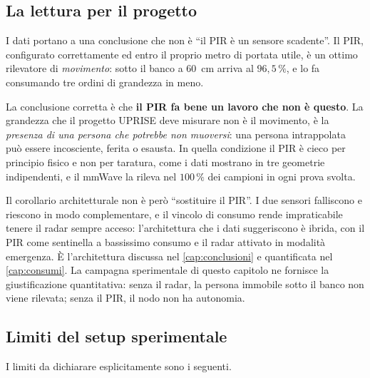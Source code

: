 \subsection{La lettura per il progetto}

I dati portano a una conclusione che non è ``il PIR è un sensore scadente''. Il PIR,
configurato correttamente ed entro il proprio metro di portata utile, è un ottimo
rilevatore di \emph{movimento}: sotto il banco a 60~cm arriva al $96{,}5\,\%$, e lo fa
consumando tre ordini di grandezza in meno.

La conclusione corretta è che \textbf{il PIR fa bene un lavoro che non è questo}. La
grandezza che il progetto UPRISE deve misurare non è il movimento, è la
\emph{presenza di una persona che potrebbe non muoversi}: una persona intrappolata può
essere incosciente, ferita o esausta. In quella condizione il PIR è cieco per
principio fisico e non per taratura, come i dati mostrano in tre geometrie
indipendenti, e il mmWave la rileva nel $100\,\%$ dei campioni in ogni prova svolta.

Il corollario architetturale non è però ``sostituire il PIR''. I due sensori
falliscono e riescono in modo complementare, e il vincolo di consumo rende
impraticabile tenere il radar sempre acceso: l'architettura che i dati suggeriscono è
ibrida, con il PIR come sentinella a bassissimo consumo e il radar attivato in
modalità emergenza. È l'architettura discussa nel \cref{cap:conclusioni} e
quantificata nel \cref{cap:consumi}. La campagna sperimentale di questo capitolo ne
fornisce la giustificazione quantitativa: senza il radar, la persona immobile sotto il
banco non viene rilevata; senza il PIR, il nodo non ha autonomia.

\subsection{Limiti del setup sperimentale}
\label{sec:limiti}

I limiti da dichiarare esplicitamente sono i seguenti.

